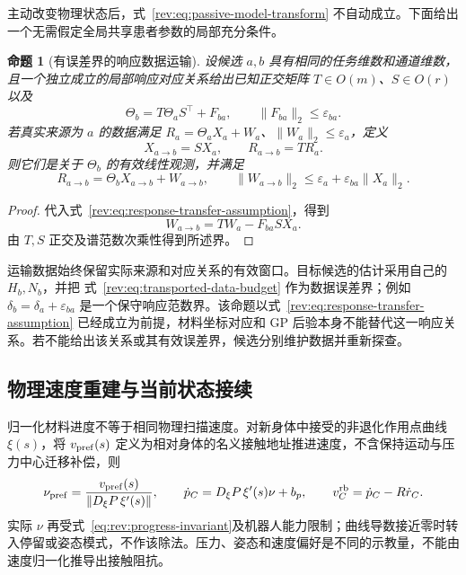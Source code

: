 \documentclass[11pt,a4paper]{article}
\numberwithin{equation}{section}
\newtheorem{proposition}[theorem]{命题}
\theoremstyle{definition}
\begin{document}
主动改变物理状态后，式~\eqref{rev:eq:passive-model-transform} 不自动成立。下面给出一个无需假定全局共享患者参数的局部充分条件。

\begin{proposition}[有误差界的响应数据运输]
\label{rev:prop:data-transfer}
设候选 $a,b$ 具有相同的任务维数和通道维数，且一个独立成立的局部响应对应关系给出已知正交矩阵
$T\in O(m)$、$S\in O(r)$ 以及
\begin{equation}
 \Theta_b=T\Theta_aS^\top+F_{ba},
 \qquad
 \|F_{ba}\|_2\le\varepsilon_{ba}.
 \label{rev:eq:response-transfer-assumption}
\end{equation}
若真实来源为 $a$ 的数据满足
$R_a=\Theta_aX_a+W_a$、$\|W_a\|_2\le\varepsilon_a$，定义
\begin{equation}
 X_{a\to b}=SX_a,\qquad
 R_{a\to b}=TR_a .
 \label{rev:eq:transported-calibration-data}
\end{equation}
则它们是关于 $\Theta_b$ 的有效线性观测，并满足
\begin{equation}
 R_{a\to b}=\Theta_bX_{a\to b}+W_{a\to b},
 \qquad
 \|W_{a\to b}\|_2
 \le\varepsilon_a+\varepsilon_{ba}\|X_a\|_2 .
 \label{rev:eq:transported-data-budget}
\end{equation}
\end{proposition}
\begin{proof}
代入式~\eqref{rev:eq:response-transfer-assumption}，得到
\begin{equation}
 W_{a\to b}=TW_a-F_{ba}SX_a.
\end{equation}
由 $T,S$ 正交及谱范数次乘性得到所述界。
\end{proof}

运输数据始终保留实际来源和对应关系的有效窗口。目标候选的估计采用自己的 $H_b,N_b$，并把
式~\eqref{rev:eq:transported-data-budget} 作为数据误差界；例如
$\delta_b=\delta_a+\varepsilon_{ba}$ 是一个保守响应范数界。该命题以式~\eqref{rev:eq:response-transfer-assumption} 已经成立为前提，材料坐标对应和 GP 后验本身不能替代这一响应关系。若不能给出该关系或其有效误差界，候选分别维护数据并重新探查。

\subsection{物理速度重建与当前状态接续}
归一化材料进度不等于相同物理扫描速度。对新身体中接受的非退化作用点曲线 $\xi(s)$，将 $v_{\rm pref}(s)$ 定义为相对身体的名义接触地址推进速度，不含保持运动与压力中心迁移补偿，则
\begin{equation}
 \nu_{\rm pref}=\frac{v_{\rm pref}(s)}{\|D_\xi P\,\xi'(s)\|},\qquad
 \dot p_C=D_\xi P\,\xi'(s)\nu+b_p,\qquad v_C^{\rm rb}=\dot p_C-R\dot r_C.
\end{equation}
实际 $\nu$ 再受式~\eqref{eq:rev:progress-invariant}及机器人能力限制；曲线导数接近零时转入停留或姿态模式，不作该除法。压力、姿态和速度偏好是不同的示教量，不能由速度归一化推导出接触阻抗。
\end{document}
